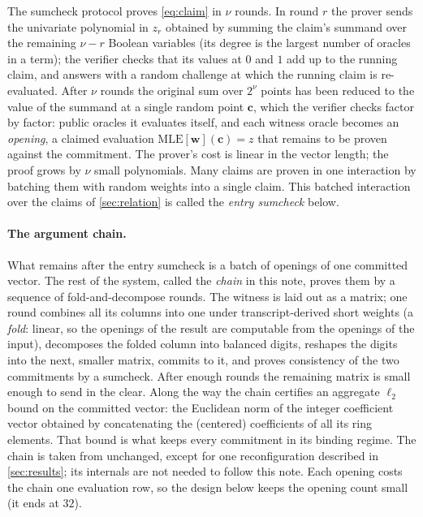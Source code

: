\documentclass[11pt]{article}
\newcommand{\MLE}{\mathrm{MLE}}
\begin{document}
The sumcheck protocol \cite{sumcheck} proves \eqref{eq:claim} in $\nu$ rounds. In round $r$ the prover sends the univariate polynomial in $z_r$ obtained by summing the claim's summand over the remaining $\nu - r$ Boolean variables (its degree is the largest number of oracles in a term); the verifier checks that its values at $0$ and $1$ add up to the running claim, and answers with a random challenge at which the running claim is re-evaluated. After $\nu$ rounds the original sum over $2^{\nu}$ points has been reduced to the value of the summand at a single random point $\mathbf{c}$, which the verifier checks factor by factor: public oracles it evaluates itself, and each witness oracle becomes an \emph{opening}, a claimed evaluation $\MLE[\mathbf{w}](\mathbf{c}) = z$ that remains to be proven against the commitment. The prover's cost is linear in the vector length; the proof grows by $\nu$ small polynomials. Many claims are proven in one interaction by batching them with random weights into a single claim. This batched interaction over the claims of \cref{sec:relation} is called the \emph{entry sumcheck} below.

\paragraph{The argument chain.} What remains after the entry sumcheck is a batch of openings of one committed vector. The rest of the system, called the \emph{chain} in this note, proves them by a sequence of fold-and-decompose rounds. The witness is laid out as a matrix; one round combines all its columns into one under transcript-derived short weights (a \emph{fold}: linear, so the openings of the result are computable from the openings of the input), decomposes the folded column into balanced digits, reshapes the digits into the next, smaller matrix, commits to it, and proves consistency of the two commitments by a sumcheck. After enough rounds the remaining matrix is small enough to send in the clear. Along the way the chain certifies an aggregate $\ell_2$ bound on the committed vector: the Euclidean norm of the integer coefficient vector obtained by concatenating the (centered) coefficients of all its ring elements. That bound is what keeps every commitment in its binding regime. The chain is taken from \cite{rokoko} unchanged, except for one reconfiguration described in \cref{sec:results}; its internals are not needed to follow this note. Each opening costs the chain one evaluation row, so the design below keeps the opening count small (it ends at $32$).
\end{document}
